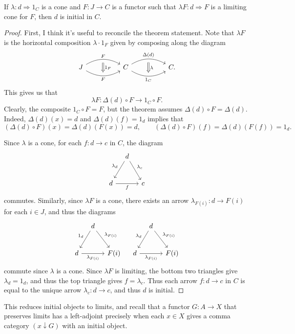 \begin{lemma}\label{lma:10.1}
	If $\lambda : d \Rightarrow 1_C$ is a cone and $F : J \to C$ is a functor such that $\lambda F : d \Rightarrow F$ is a limiting cone for $F$, then $d$ is initial in $C$.
\end{lemma}
\begin{proof}
	First, I think it's useful to reconcile the theorem statement. Note that $\lambda F$ is the horizontal composition $\lambda \cdot 1_F$ given by composing along the diagram
	\[\begin{tikzcd}[row sep = 5em, column sep = 5em]
		J\ar[r, bend left, "F"{name=f1}]\ar[r, bend right, "F"'{name=g1}]&C\ar[r, bend left, "\Delta(d)"{name=f2}]\ar[r, bend right, "1_C"'{name=g2}]&C.
		\arrow[from=f1, to=g1, shorten=5px, Rightarrow, "1_F"]\arrow[from=f2, to=g2, shorten=5px, Rightarrow, "\lambda"]
	\end{tikzcd}\]
	This gives us that
	\[
		\lambda F : \Delta(d) \circ F \to 1_C \circ F
	.\]
	Clearly, the composite $1_C \circ F=F$, but the theorem assumes $\Delta(d)\circ F=\Delta(d)$. Indeed, $\Delta(d)(x)=d$ and $\Delta(d)(f)=1_d$ implies that
	\[
		(\Delta(d)\circ F)(x)=\Delta(d)(F(x))=d,\qquad (\Delta(d)\circ F)(f)=\Delta(d)(F(f))=1_d
	.\]
	
	Since $\lambda$ is a cone, for each $f : d \to c$ in $C$, the diagram
	\[\begin{tikzcd}[row sep = 2.5em, column sep = 1em]
	 & d \ar[" \lambda_c ", dr] \ar[" \lambda_d "', dl]  &  \\
	d \ar[" f "', rr]  &  & c
	\end{tikzcd}\]
	commutes. Similarly, since $\lambda F$ is a cone, there exists an arrow $\lambda_{F(i)} : d \to F(i)$ for each $i\in J$, and thus the diagrams
	\[\begin{tikzcd}[row sep = 2.5em, column sep = 1em]
	 & d \ar[" \lambda_{F(i)}  ", dr] \ar[" 1_d "', dl]  &  &  & d \ar[" \lambda_{F(i)}  ", dr] \ar[" \lambda_d "', dl]  &  \\
	d \ar[" \lambda_{F(i)}  "', rr]  &  & F(i) & d \ar[" \lambda_{F(i)}  "', rr]  &  & F(i)
	\end{tikzcd}\]
	commute since $\lambda$ is a cone. Since $\lambda F$ is limiting, the bottom two triangles give $\lambda_d = 1_d$, and thus the top triangle gives $f=\lambda_c$. Thus each arrow $f : d \to c$ in $C$ is equal to the unique arrow $\lambda_c : d \to c$, and thus $d$ is initial.
\end{proof}

This reduces initial objects to limits, and recall that a functor $G : A \to X$ that preserves limits has a left-adjoint precisely when each $x\in X$ gives a comma category $(x\downarrow G)$ with an initial object.

